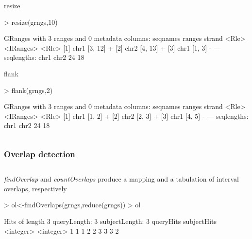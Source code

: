 \documentclass{beamer}
\begin{document}
\begin{frame}[fragile]
\begin{columns}
  \begin{column}{0.55\textwidth}
  \bit
      \item resize
           \begin{uncoverenv}
\begin{Schunk}
\begin{Sinput}
> resize(grngs,10)
\end{Sinput}
\begin{Soutput}
GRanges with 3 ranges and 0 metadata columns:
      seqnames    ranges strand
         <Rle> <IRanges>  <Rle>
  [1]     chr1   [3, 12]      +
  [2]     chr2   [4, 13]      +
  [3]     chr1   [1,  3]      -
  ---
  seqlengths:
   chr1 chr2
     24   18
\end{Soutput}
\end{Schunk}
        \end{uncoverenv} 
      \item flank
           \begin{uncoverenv}
\begin{Schunk}
\begin{Sinput}
> flank(grngs,2)
\end{Sinput}
\begin{Soutput}
GRanges with 3 ranges and 0 metadata columns:
      seqnames    ranges strand
         <Rle> <IRanges>  <Rle>
  [1]     chr1    [1, 2]      +
  [2]     chr2    [2, 3]      +
  [3]     chr1    [4, 5]      -
  ---
  seqlengths:
   chr1 chr2
     24   18
\end{Soutput}
\end{Schunk}
        \end{uncoverenv}  
  \eit
  \end{column}
  
\end{columns}
\end{frame}


\begin{frame}[fragile]
\frametitle{Overlap detection}
\begin{column}{1\textwidth}
  \bit
      \item \emph{findOverlap} and \emph{countOverlaps} produce a mapping and a tabulation of interval overlaps, respectively
            \begin{uncoverenv}
\begin{Schunk}
\begin{Sinput}
> ol<-findOverlaps(grngs,reduce(grngs))
> ol
\end{Sinput}
\begin{Soutput}
Hits of length 3
queryLength: 3
subjectLength: 3
  queryHits subjectHits 
   <integer>   <integer> 
 1         1           1 
 2         2           3 
 3         3           2 
\end{Soutput}
\end{Schunk}
        \end{uncoverenv}       
  \eit
  \end{column}
\end{frame}
\end{document}

